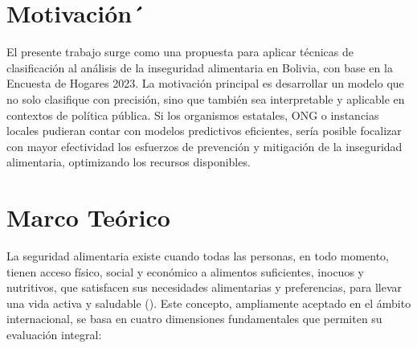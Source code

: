\documentclass[Royal,times,sageh]{sagej}
\begin{document}
\section{Motivación´}\label{motivaciuxf3n}

El presente trabajo surge como una propuesta para aplicar técnicas de
clasificación al análisis de la inseguridad alimentaria en Bolivia, con
base en la Encuesta de Hogares 2023. La motivación principal es
desarrollar un modelo que no solo clasifique con precisión, sino que
también sea interpretable y aplicable en contextos de política pública.
Si los organismos estatales, ONG o instancias locales pudieran contar
con modelos predictivos eficientes, sería posible focalizar con mayor
efectividad los esfuerzos de prevención y mitigación de la inseguridad
alimentaria, optimizando los recursos disponibles.

\section{Marco Teórico}\label{marco-teuxf3rico}

La seguridad alimentaria existe cuando todas las personas, en todo
momento, tienen acceso físico, social y económico a alimentos
suficientes, inocuos y nutritivos, que satisfacen sus necesidades
alimentarias y preferencias, para llevar una vida activa y saludable
(\citet{fao2011}). Este concepto, ampliamente aceptado en el ámbito
internacional, se basa en cuatro dimensiones fundamentales que permiten
su evaluación integral:
\end{document}
